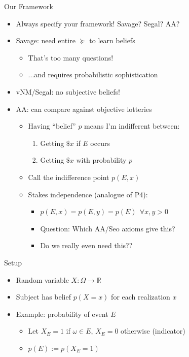 \begin{frame}{Our Framework}
\begin{itemize}
    \item Always specify your framework! Savage? Segal? AA?
    \item Savage: need entire $\succeq$ to learn beliefs
    \begin{itemize}
        \item That's too many questions!
        \item ...and requires probabilistic sophistication
    \end{itemize}
    \item vNM/Segal: no subjective beliefs!
    \item AA: can compare against objective lotteries
    \begin{itemize}
        \item Having ``belief'' $p$ means I'm indifferent between:
        \begin{enumerate}
            \item Getting $\$x$ if $E$ occurs
            \item Getting $\$x$ with probability $p$
        \end{enumerate}
        \item Call the indifference point $p(E,x)$
        \item Stakes independence (analogue of P4):
        \begin{itemize}
            \item $p(E,x)=p(E,y)=p(E)\ \ \forall x,y>0$
            \item Question: Which AA/Seo axioms give this?
            \item Do we really even need this??
        \end{itemize}
    \end{itemize}
\end{itemize}
\end{frame}

\begin{frame}{Setup}
\begin{itemize}
    \item Random variable $X:\Omega\rightarrow \mathbb{R}$
    \item Subject has belief $p(X=x)$ for each realization $x$
    \item Example: probability of event $E$
    \begin{itemize}
        \item Let $X_E=1$ if $\omega\in E$, $X_E=0$ otherwise (indicator)
        \item $p(E):=p(X_E=1)$
    \end{itemize}
\end{itemize}
\end{frame}

